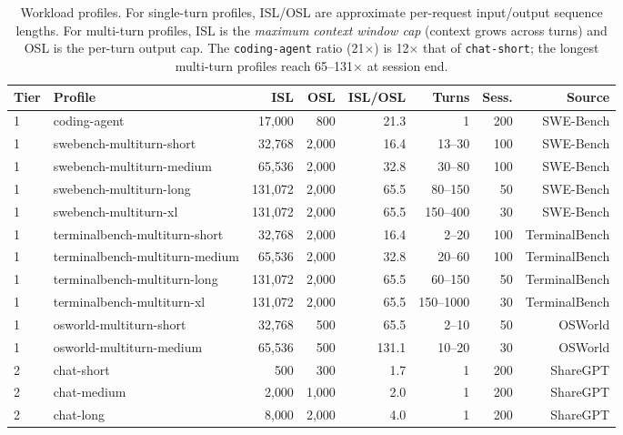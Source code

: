 \begin{table}[t]
\caption{Workload profiles. For single-turn profiles, ISL/OSL are approximate per-request input/output sequence lengths. For multi-turn profiles, ISL is the \emph{maximum context window cap} (context grows across turns) and OSL is the per-turn output cap. The \texttt{coding-agent} ratio (21$\times$) is 12$\times$ that of \texttt{chat-short}; the longest multi-turn profiles reach 65--131$\times$ at session end.}
\label{tab:profiles}
\centering
\small
\begin{tabular}{llrrrrrr}
\toprule
\textbf{Tier} & \textbf{Profile} & \textbf{ISL} & \textbf{OSL} & \textbf{ISL/OSL} & \textbf{Turns} & \textbf{Sess.} & \textbf{Source} \\
\midrule
1 & coding-agent                     & 17{,}000  & 800   & 21.3 & 1       & 200 & SWE-Bench \\
1 & swebench-multiturn-short         & 32{,}768  & 2{,}000 & 16.4 & 13--30  & 100 & SWE-Bench \\
1 & swebench-multiturn-medium        & 65{,}536  & 2{,}000 & 32.8 & 30--80  & 100 & SWE-Bench \\
1 & swebench-multiturn-long          & 131{,}072 & 2{,}000 & 65.5 & 80--150 & 50  & SWE-Bench \\
1 & swebench-multiturn-xl            & 131{,}072 & 2{,}000 & 65.5 & 150--400 & 30 & SWE-Bench \\
1 & terminalbench-multiturn-short    & 32{,}768  & 2{,}000 & 16.4 & 2--20   & 100 & TerminalBench \\
1 & terminalbench-multiturn-medium   & 65{,}536  & 2{,}000 & 32.8 & 20--60  & 100 & TerminalBench \\
1 & terminalbench-multiturn-long     & 131{,}072 & 2{,}000 & 65.5 & 60--150 & 50  & TerminalBench \\
1 & terminalbench-multiturn-xl       & 131{,}072 & 2{,}000 & 65.5 & 150--1000 & 30 & TerminalBench \\
1 & osworld-multiturn-short          & 32{,}768  & 500   & 65.5 & 2--10   & 50  & OSWorld \\
1 & osworld-multiturn-medium         & 65{,}536  & 500   & 131.1 & 10--20 & 30  & OSWorld \\
\midrule
2 & chat-short                       & 500      & 300   & 1.7  & 1       & 200 & ShareGPT \\
2 & chat-medium                      & 2{,}000  & 1{,}000 & 2.0 & 1       & 200 & ShareGPT \\
2 & chat-long                        & 8{,}000  & 2{,}000 & 4.0 & 1       & 200 & ShareGPT \\

\end{tabular}
\end{table}
